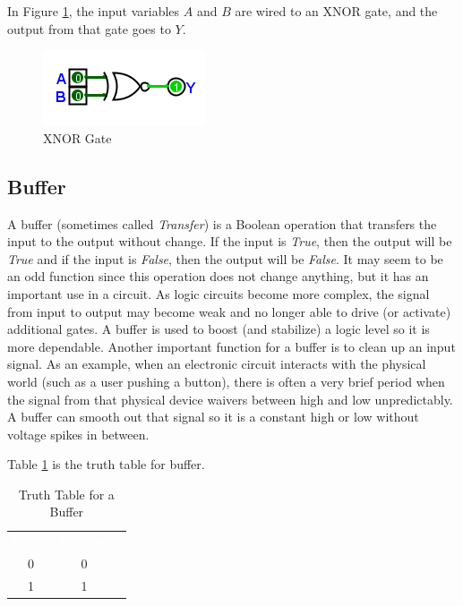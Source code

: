 In Figure \ref{fig:04_08}, the input variables $ A $ and $ B $ are wired to an \textsf{XNOR}  gate, and the output from that gate goes to $ Y $. 

\begin{figure}[H]
	\centering
	\includegraphics[width=\maxwidth{.95\linewidth}]{gfx/04_08}
	\caption{XNOR Gate}
	\label{fig:04_08}
\end{figure}


\subsection{Buffer}
\label{BF:subsec:buffer}

A buffer (sometimes called \emph{Transfer}) is a Boolean operation that transfers the input to the output without change. If the input is \emph{True}, then the output will be \emph{True} and if the input is \emph{False}, then the output will be \emph{False}. It may seem to be an odd function since this operation does not change anything, but it has an important use in a circuit. As logic circuits become more complex, the signal from input to output may become weak and no longer able to drive (or activate) additional gates. A buffer is used to boost (and stabilize) a logic level so it is more dependable. Another important function for a buffer is to clean up an input signal. As an example, when an electronic circuit interacts with the physical world (such as a user pushing a button), there is often a very brief period when the signal from that physical device waivers between high and low unpredictably. A buffer can smooth out that signal so it is a constant high or low without voltage spikes in between. 

Table \ref{BF:tab:truth_table_for_a_buffer} is the truth table for buffer.

\begin{table}[H]
  \sffamily
  \newcommand{\head}[1]{\textcolor{white}{\textbf{#1}}}    
  \begin{center}
    \begin{tabular}{ccc} 
      \rowcolor{black!75}
      \head{Input} & \head{Output} \\
      0 & 0 \\
      1 & 1 
    \end{tabular}
  \end{center}
  \caption{Truth Table for a Buffer}
  \label{BF:tab:truth_table_for_a_buffer}
\end{table}

